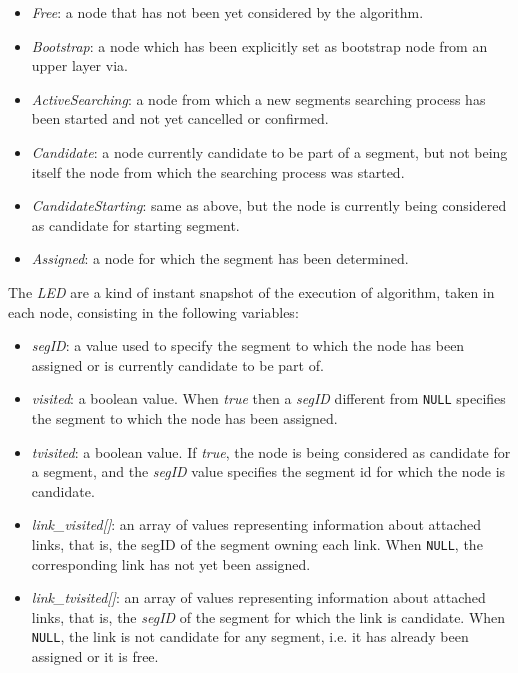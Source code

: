 \begin{itemize}
\item{\emph{Free}}: a node that has  not been yet considered  by the \disr{} algorithm.
\item{\emph{Bootstrap}}: a node which has been explicitly set as bootstrap node from
an upper layer via. 
\item{\emph{ActiveSearching}}: a node from which a new segments searching process has
been started and not yet cancelled or confirmed. 
\item{\emph{Candidate}}: a node currently candidate to be part of a segment, but not being itself the node from which the searching process was started. 
\item{\emph{CandidateStarting}}: same as above, but the node is currently being considered as candidate
for starting segment. 
\item{\emph{Assigned}}: a node for which the segment has been determined.  
\end{itemize}

The \emph{LED} are a kind of instant snapshot of the execution of \disr{} algorithm, taken in each node,
consisting in the following variables:

\begin{itemize}
\item{\emph{segID}}: a value used to specify the segment to which the
node has been assigned or is currently candidate to be part of.
\item{\emph{visited}}: a boolean value. When \emph{true}
then a \emph{segID} different from \texttt{NULL} specifies the segment 
to which the node has been assigned. 
\item{\emph{tvisited}}: a boolean value. If \emph{true}, the node is
being considered as candidate for a segment, and the \emph{segID} value
specifies the segment id for which the node is candidate. 
\item{\emph{link\_visited[]}}: an array
of values representing information about attached links, that is, the
segID of the segment owning each link. When \texttt{NULL}, the corresponding link has not yet been
assigned.
\item{\emph{link\_tvisited[]}}: an array of
values representing information about attached links, that is, the \emph{segID} of
the segment for which the link is candidate. When \texttt{NULL}, the link is
not candidate for any segment, i.e. it has already been assigned or it is free.
\end{itemize}

